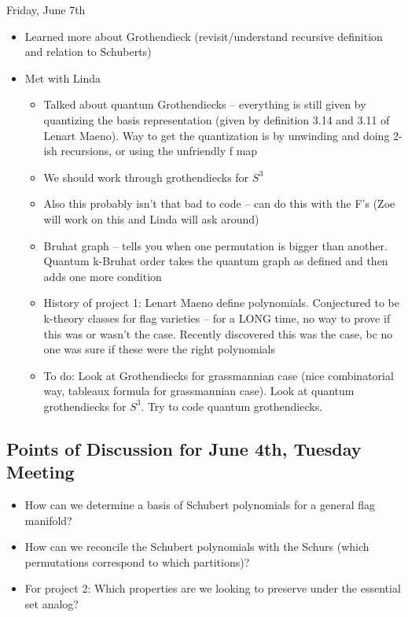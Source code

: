 Friday, June 7th
\begin{itemize}
    \item Learned more about Grothendieck (revisit/understand recursive definition and relation to Schuberts)
    \item Met with Linda
    \begin{itemize}
        \item Talked about quantum Grothendiecks -- everything is still given by quantizing the basis representation (given by definition 3.14 and 3.11 of Lenart Maeno). Way to get the quantization is by unwinding and doing 2-ish recursions, or using the unfriendly f map
        \item We should work through grothendiecks for $S^3$
        \item Also this probably isn't that bad to code -- can do this with the F's (Zoe will work on this and Linda will ask around)
        \item Bruhat graph -- tells you when one permutation is bigger than another. Quantum k-Bruhat order takes the quantum graph as defined and then adds one more condition
        \item History of project 1: Lenart Maeno define polynomials. Conjectured to be k-theory classes for flag varieties -- for a LONG time, no way to prove if this was or wasn't the case. Recently discovered this was the case, bc no one was sure if these were the right polynomials
        \item To do: Look at Grothendiecks for grassmannian case (nice combinatorial way, tableaux formula for grassmannian case). Look at quantum grothendiecks for $S^3$. Try to code quantum grothendiecks.
    \end{itemize}
\end{itemize}

\subsection{Points of Discussion for June 4th, Tuesday Meeting}

\begin{itemize}
    \item How can we determine a basis of Schubert polynomials for a general flag manifold?
    \item How can we reconcile the Schubert polynomials with the Schurs (which permutations correspond to which partitions)?
    \item For project 2: Which properties are we looking to preserve under the essential set analog?
\end{itemize}

